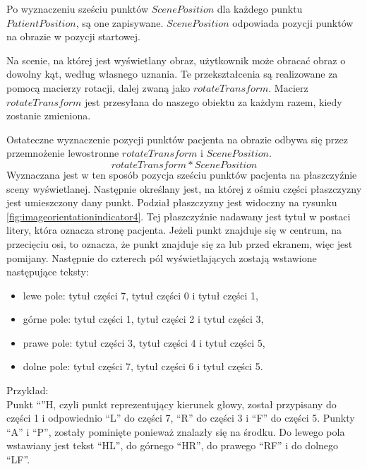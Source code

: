 \par
Po wyznaczeniu sześciu punktów $ScenePosition$ dla każdego punktu $PatientPosition$, są one zapisywane.
$ScenePosition$ odpowiada pozycji punktów na obrazie w pozycji startowej.

\par
Na scenie, na której jest wyświetlany obraz, użytkownik może obracać obraz o dowolny kąt, według własnego uznania.
Te przekształcenia są realizowane za pomocą macierzy rotacji, dalej zwaną jako $rotateTransform$.
Macierz $rotateTransform$ jest przesyłana do naszego obiektu  za każdym razem, kiedy zostanie zmieniona.

\par
Ostateczne wyznaczenie pozycji punktów pacjenta na obrazie odbywa się przez przemnożenie lewostronne $rotateTransform$ i $ScenePosition$.
\[rotateTransform * ScenePosition\]
Wyznaczana jest w ten sposób pozycja sześciu punktów pacjenta na płaszczyźnie sceny wyświetlanej.
Następnie określany jest, na której z ośmiu części płaszczyzny jest umieszczony dany punkt.
Podział płaszczyzny jest widoczny na rysunku \ref{fig:imageorientationindicator4}.
Tej płaszczyźnie nadawany jest tytuł w postaci litery, która oznacza stronę pacjenta.
Jeżeli punkt znajduje się w centrum, na przecięciu osi, to oznacza, że punkt znajduje się za lub przed ekranem, więc jest pomijany.
Następnie do czterech pól wyświetlających zostają wstawione następujące teksty:
\begin{itemize}
    \item lewe pole: tytuł części 7, tytuł części 0 i tytuł części 1,
    \item górne pole: tytuł części 1, tytuł części 2 i tytuł części 3,
    \item prawe pole: tytuł części 3, tytuł części 4 i tytuł części 5,
    \item dolne pole: tytuł części 7, tytuł części 6 i tytuł części 5.
\end{itemize}

\par
Przykład:\\
Punkt \enquote{}{H}, czyli punkt reprezentujący kierunek głowy, został przypisany do części 1 i odpowiednio \enquote{L} do części 7, \enquote{R} do części 3 i \enquote{F} do części 5.
Punkty \enquote{A} i \enquote{P}, zostały pominięte ponieważ znalazły się na środku.
Do lewego pola wstawiany jest tekst \enquote{HL}, do górnego \enquote{HR}, do prawego \enquote{RF} i do dolnego \enquote{LF}.

